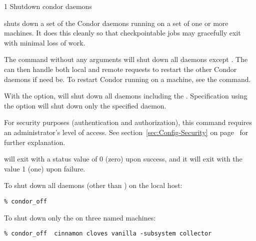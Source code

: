 \begin{ManPage}{\label{man-condor-off}}{1}
{Shutdown condor daemons}
\Synopsis {}
\ToolArgsBase

\ToolDebugOption
\ToolArgsLocate
\ToolArgsAffect

\ToolDebugOption
\ToolWhere
\ToolArgsAffect


\Description 

 shuts down a set of the Condor daemons running on a set of
one or more machines.
It does this cleanly so that checkpointable jobs may gracefully exit with
minimal loss of work.

The command  without any arguments will shut down
all daemons except .
The  can then handle both local and remote
requests to restart the other Condor daemons if need be.  To restart
Condor running on a machine, see the  command.

With the  option,  will shut down
all daemons including the .
Specification using the  option
will shut down
only the specified daemon.

For security purposes (authentication and authorization),
this command requires an administrator's level of access.
See
section~\ref{sec:Config-Security} on page~\pageref{sec:Config-Security}
for further explanation.

\begin{Options}
	\ToolArgsBaseDesc
	\ToolDebugDesc
	\ToolArgsLocateDesc
	\ToolArgsAffectDesc
\end{Options}

\ExitStatus
{} will exit with a status value of 0 (zero) upon success,
and it will exit with the value 1 (one) upon failure.


\Examples
To shut down all daemons (other than ) on the
local host:
\begin{verbatim}
% condor_off
\end{verbatim}

To shut down only the  on three named machines:
\begin{verbatim}
% condor_off  cinnamon cloves vanilla -subsystem collector
\end{verbatim}


\end{ManPage}
